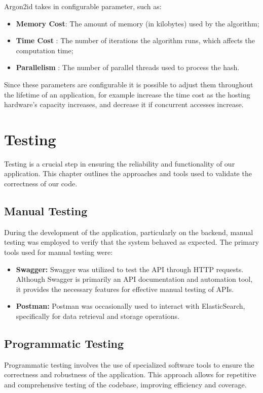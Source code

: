 Argon2id takes in configurable parameter, such as:
\begin{itemize}
	\item \textbf{Memory Cost}: The amount of memory (in kilobytes) used by the algorithm;
	\item \textbf{Time Cost} : The number of iterations the algorithm runs, which affects the computation time;
	\item \textbf{Parallelism} : The number of parallel threads used to process the hash.
\end{itemize}

Since these parameters are configurable it is possible to adjust them throughout the lifetime of an application, for example increase the time cost as the hosting hardware's capacity increases, and decrease it if concurrent accesses increase.

\newpage

\section{Testing}

Testing is a crucial step in ensuring the reliability and functionality of our application. This chapter outlines the approaches and tools used to validate the correctness of our code.

\subsection{Manual Testing}

During the development of the application, particularly on the backend, manual testing was employed to verify that the system behaved as expected. The primary tools used for manual testing were:

\begin{itemize} 
	\item \textbf{Swagger:} Swagger was utilized to test the API through HTTP requests. Although Swagger is primarily an API documentation and automation tool, it provides the necessary features for effective manual testing of APIs. 
	\item \textbf{Postman:} Postman was occasionally used to interact with ElasticSearch, specifically for data retrieval and storage operations. 
\end{itemize}

\subsection{Programmatic Testing}
Programmatic testing involves the use of specialized software tools to ensure the correctness and robustness of the application. This approach allows for repetitive and comprehensive testing of the codebase, improving efficiency and coverage.

